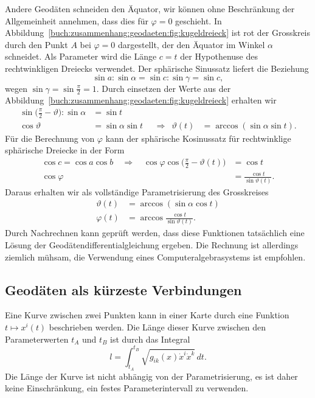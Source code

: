 Andere Geodäten schneiden den Äquator, wir können ohne Beschränkung der
Allgemeinheit annehmen, dass dies für $\varphi=0$ geschieht.
In Abbildung~\ref{buch:zusammenhang:geodaeten:fig:kugeldreieck}
ist rot der Grosskreis durch den Punkt $A$ bei $\varphi=0$ dargestellt,
der den Äquator im Winkel $\alpha$ schneidet.
Als Parameter wird die Länge $c=t$ der Hypothenuse des rechtwinkligen
Dreiecks verwendet.
Der sphärische Sinussatz liefert die Beziehung
\[
\sin a : \sin \alpha
=
\sin c : \sin\gamma
=
\sin c,
\]
wegen $\sin\gamma=\sin\frac{\pi}2=1$.
Durch einsetzen der Werte aus der
Abbildung~\ref{buch:zusammenhang:geodaeten:fig:kugeldreieck}
erhalten wir
\begin{align*}
\sin\biggl(\frac{\pi}2-\vartheta\biggr) : \sin\alpha
&=
\sin t
\\
\cos\vartheta
&=
\sin\alpha \sin t
&&\Rightarrow&
\vartheta(t) &= \arccos(\sin\alpha\sin t).
\end{align*}
Für die Berechnung von $\varphi$ kann der sphärische Kosinussatz
für rechtwinklige sphärische Dreiecke in der Form
\begin{align*}
\cos c = \cos a\cos b
\quad\Rightarrow\quad
\cos\varphi\cos\biggl(\frac{\pi}2-\vartheta(t)\biggr)
&=
\cos t
\\
\cos\varphi
&= 
\frac{
\cos t
}{
\sin\vartheta(t)
}.
\end{align*}
Daraus erhalten wir als vollständige Parametrisierung des Grosskreises
\begin{equation}
\begin{aligned}
\vartheta(t)
&=
\arccos(\sin\alpha\cos t)
\\
\varphi(t)
&=
\arccos\frac{\cos t}{\sin\vartheta(t)}.
\end{aligned}
\label{buch:zusammenhang:geodaeten:eqn:kugelgeodaeten}
\end{equation}
Durch Nachrechnen kann geprüft werden, dass diese Funktionen tatsächlich
eine Lösung der Geodätendifferentialgleichung ergeben.
Die Rechnung ist allerdings ziemlich mühsam, die Verwendung eines
Computeralgebrasystems ist empfohlen.


%
%
\subsection{Geodäten als kürzeste Verbindungen
\label{buch:zusammenhang:geodaeten:subsection:kuerzeste}}
Eine Kurve zwischen zwei Punkten kann in einer Karte durch eine Funktion
\(
t\mapsto x^i(t)
\)
beschrieben werden.
Die Länge dieser Kurve zwischen den Parameterwerten $t_A$ und $t_B$
ist durch das Integral
\begin{equation}
l
=
\int_{t_A}^{t_B}
\sqrt{g_{ik}(x) \dot{x}^i \dot{x}^k }
\,dt.
\label{buch:zusammenhang:geodaeten:eqn:funktional}
\end{equation}
Die Länge der Kurve ist nicht abhängig von der Parametrisierung, es ist
daher keine Einschränkung, ein festes Parameterintervall zu verwenden.


